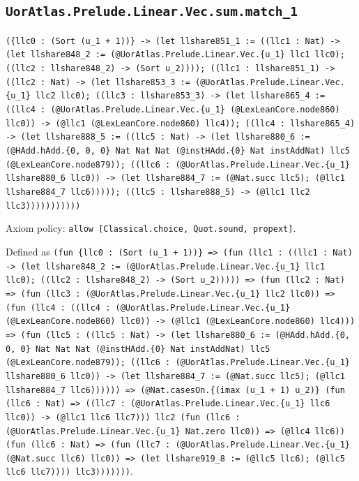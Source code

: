 \documentclass[11pt]{article}
\begin{document}
\subsection*{\texttt{UorAtlas.Prelude.Linear.Vec.sum.match\_1}}
\noindent\texttt{(\{llc0 : (Sort (u\_1 + 1))\} -> (let llshare851\_1 := ((llc1 : Nat) -> (let llshare848\_2 := (@UorAtlas.Prelude.Linear.Vec.\{u\_1\} llc1 llc0); ((llc2 : llshare848\_2) -> (Sort u\_2)))); ((llc1 : llshare851\_1) -> ((llc2 : Nat) -> (let llshare853\_3 := (@UorAtlas.Prelude.Linear.Vec.\{u\_1\} llc2 llc0); ((llc3 : llshare853\_3) -> (let llshare865\_4 := ((llc4 : (@UorAtlas.Prelude.Linear.Vec.\{u\_1\} (@LexLeanCore.node860) llc0)) -> (@llc1 (@LexLeanCore.node860) llc4)); ((llc4 : llshare865\_4) -> (let llshare888\_5 := ((llc5 : Nat) -> (let llshare880\_6 := (@HAdd.hAdd.\{0, 0, 0\} Nat Nat Nat (@instHAdd.\{0\} Nat instAddNat) llc5 (@LexLeanCore.node879)); ((llc6 : (@UorAtlas.Prelude.Linear.Vec.\{u\_1\} llshare880\_6 llc0)) -> (let llshare884\_7 := (@Nat.succ llc5); (@llc1 llshare884\_7 llc6))))); ((llc5 : llshare888\_5) -> (@llc1 llc2 llc3)))))))))))}\par
\noindent Axiom policy: \texttt{allow [Classical.choice, Quot.sound, propext]}.\par
\noindent Defined as \texttt{(fun \{llc0 : (Sort (u\_1 + 1))\} => (fun (llc1 : ((llc1 : Nat) -> (let llshare848\_2 := (@UorAtlas.Prelude.Linear.Vec.\{u\_1\} llc1 llc0); ((llc2 : llshare848\_2) -> (Sort u\_2))))) => (fun (llc2 : Nat) => (fun (llc3 : (@UorAtlas.Prelude.Linear.Vec.\{u\_1\} llc2 llc0)) => (fun (llc4 : ((llc4 : (@UorAtlas.Prelude.Linear.Vec.\{u\_1\} (@LexLeanCore.node860) llc0)) -> (@llc1 (@LexLeanCore.node860) llc4))) => (fun (llc5 : ((llc5 : Nat) -> (let llshare880\_6 := (@HAdd.hAdd.\{0, 0, 0\} Nat Nat Nat (@instHAdd.\{0\} Nat instAddNat) llc5 (@LexLeanCore.node879)); ((llc6 : (@UorAtlas.Prelude.Linear.Vec.\{u\_1\} llshare880\_6 llc0)) -> (let llshare884\_7 := (@Nat.succ llc5); (@llc1 llshare884\_7 llc6)))))) => (@Nat.casesOn.\{(imax (u\_1 + 1) u\_2)\} (fun (llc6 : Nat) => ((llc7 : (@UorAtlas.Prelude.Linear.Vec.\{u\_1\} llc6 llc0)) -> (@llc1 llc6 llc7))) llc2 (fun (llc6 : (@UorAtlas.Prelude.Linear.Vec.\{u\_1\} Nat.zero llc0)) => (@llc4 llc6)) (fun (llc6 : Nat) => (fun (llc7 : (@UorAtlas.Prelude.Linear.Vec.\{u\_1\} (@Nat.succ llc6) llc0)) => (let llshare919\_8 := (@llc5 llc6); (@llc5 llc6 llc7)))) llc3)))))))}.\par
\end{document}
